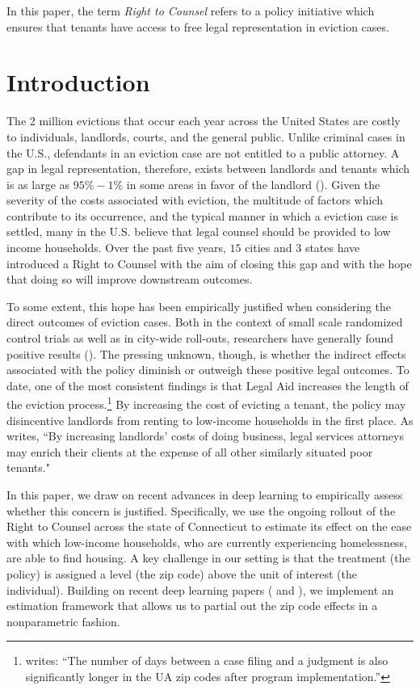 \documentclass[a4paper,12pt]{article}
\begin{document}


In this paper, the term \textit{Right to Counsel} refers to a policy initiative which ensures that tenants have access to free legal representation in eviction cases. 

\section{Introduction}
The 2 million evictions that occur each year across the United States are costly to individuals, landlords, courts, and the general public. Unlike criminal cases in the U.S., defendants in an eviction case are not entitled to a public attorney. A gap in legal representation, therefore, exists between landlords and tenants which is as large as $95\%-1\%$ in some areas in favor of the landlord  (\cite{collinson2022eviction}). Given the severity of the costs associated with eviction, the multitude of factors which contribute to its occurrence, and the typical manner in which a eviction case is settled, many in the U.S. believe that legal counsel should be provided to low income households. Over the past five years, $15$ cities and $3$ states have introduced a Right to Counsel with the aim of closing this gap and with the hope that doing so will improve downstream outcomes.\par 

To some extent, this hope has been empirically justified when considering the direct outcomes of eviction cases. Both in the context of small scale randomized control trials as well as in city-wide roll-outs, researchers have generally found positive results (\cite{seron2001impact, greiner2012limits, cassidy2022effects}). The pressing unknown, though, is whether the indirect effects associated with the policy diminish or outweigh these positive legal outcomes. To date, one of the most consistent findings is that Legal Aid increases the length of the eviction process.\footnote{\cite{cassidy2022effects} writes: ``The number of days between a case filing and a judgment is also significantly longer in the UA zip codes after program implementation.''} By increasing the cost of evicting a tenant, the policy may disincentive landlords from renting to low-income households in the first place. As \cite{gunn1995eviction} writes, ``By increasing landlords' costs of doing business, legal services attorneys may enrich their clients at the expense of all other similarly situated poor tenants." \par 
In this paper, we draw on recent advances in deep learning to empirically assess whether this concern is justified. Specifically, we use the ongoing rollout of the Right to Counsel across the state of Connecticut to estimate its effect on the ease with which low-income households, who are currently experiencing homelessness, are able to find housing. A key challenge in our setting is that the treatment (the policy) is assigned a level (the zip code) above the unit of interest (the individual). Building on recent deep learning papers (\cite{finn2017model} and \cite{kelly2020learning}), we implement an estimation framework that allows us to partial out the zip code effects in a nonparametric fashion.
\end{document}
